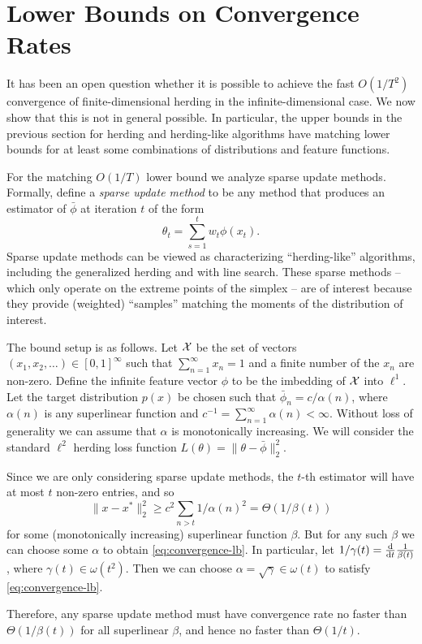 \documentclass[paper.tex]{subfiles}
\begin{document}
\section{Lower Bounds on Convergence Rates}
\label{sec:lower-bounds}

It has been an open question whether it is possible to achieve the fast $O(1/T^{2})$ convergence of finite-dimensional herding in the infinite-dimensional case. We now show that this is not in general possible. In particular, the upper bounds in the previous section for herding and herding-like algorithms have matching lower bounds for at least some combinations of distributions and feature functions. 

For the matching $O(1/T)$ lower bound we analyze sparse update methods. Formally, define a {\em sparse update method} to be any method that produces an estimator of $\bar \phi$ at iteration $t$ of the form 
\[
\theta_{t} = \sum_{s =1}^{t}w_{t} \phi(x_{t}).
\]
Sparse update methods can be viewed as characterizing ``herding-like'' algorithms, including the generalized herding and \cgd with line search. These sparse methods -- which only operate on the extreme points of the simplex -- are of interest because they provide (weighted) ``samples'' matching the moments of the distribution of interest. 

The bound setup is as follows. Let $\mathcal{X}$ be the set of vectors $(x_{1},x_{2},\dots) \in [0,1]^{\infty}$ such that $\sum_{n=1}^{\infty} x_{n} = 1$ and a finite number of the $x_{n}$ are non-zero. Define the infinite feature vector $\phi$ to be the imbedding of $\mathcal{X}$ into $\ell^{1}$. Let the target distribution $p(x)$ be chosen such that $\bar\phi_{n} = c/\alpha(n)$, where $\alpha(n)$ is any superlinear function and $c^{-1} = \sum_{n=1}^{\infty} \alpha(n) < \infty$. Without loss of generality we can assume that $\alpha$ is monotonically increasing. We will consider the standard $\ell^{2}$ herding loss function $L(\theta) = \|\theta - \bar \phi\|_2^2$. 

Since we are only considering sparse update methods, the $t$-th estimator will have at most $t$ non-zero entries, and so 
\[
\|x-x^{*}\|_2^2 \ge c^{2}\sum_{n > t} 1/\alpha(n)^{2} = \Theta(1/\beta(t)) \label{eq:convergence-lb}
\]
for some (monotonically increasing) superlinear function $\beta$. But for any such $\beta$ we can choose some $\alpha$ to obtain \eqref{eq:convergence-lb}. In particular, let $1/\gamma(t) = \frac{\mathrm{d}}{\mathrm{d} t}\frac{1}{\beta(t)}$, where $\gamma(t) \in \omega(t^{2})$. Then we can choose $\alpha = \sqrt \gamma \in \omega(t)$ to satisfy \eqref{eq:convergence-lb}. 

Therefore, any sparse update method must have convergence rate no faster than $\Theta(1/\beta(t))$ for all superlinear $\beta$, and hence no faster than $\Theta(1/t)$. 
\end{document}
